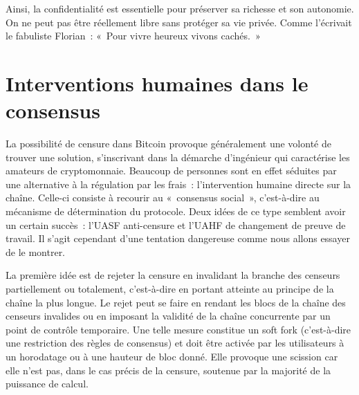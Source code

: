 Ainsi, la confidentialité est essentielle pour préserver sa richesse et son autonomie. On ne peut pas être réellement libre sans protéger sa vie privée. Comme l'écrivait le fabuliste Florian~: «~Pour vivre heureux vivons cachés.~»

\section*{Interventions humaines dans le consensus}

La possibilité de censure dans Bitcoin provoque généralement une volonté de trouver une solution, s'inscrivant dans la démarche d'ingénieur qui caractérise les amateurs de cryptomonnaie. Beaucoup de personnes sont en effet séduites par une alternative à la régulation par les frais~: l'intervention humaine directe sur la chaîne. Celle-ci consiste à recourir au «~consensus social~», c'est-à-dire au mécanisme de détermination du protocole. Deux idées de ce type semblent avoir un certain succès~: l'UASF anti-censure et l'UAHF de changement de preuve de travail. Il s'agit cependant d'une tentation dangereuse comme nous allons essayer de le montrer.



La première idée est de rejeter la censure en invalidant la branche des censeurs partiellement ou totalement, c'est-à-dire en portant atteinte au principe de la chaîne la plus longue. Le rejet peut se faire en rendant les blocs de la chaîne des censeurs invalides ou en imposant la validité de la chaîne concurrente par un point de contrôle temporaire. Une telle mesure constitue un soft fork (c'est-à-dire une restriction des règles de consensus) et doit être activée par les utilisateurs à un horodatage ou à une hauteur de bloc donné. Elle provoque une scission car elle n'est pas, dans le cas précis de la censure, soutenue par la majorité de la puissance de calcul.

